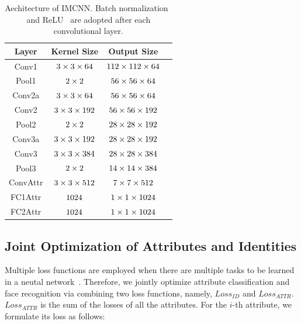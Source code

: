 \documentclass[wcp]{jmlr}
\begin{document}
	\begin{table}[htb]
		\begin{center}
			\begin{tabular}{|c|c|c|c}
				\hline
				Layer & Kernel Size & Output Size \\
				\hline
				Conv1 & $\tiny{3\times3\times64}$ & $\tiny{112\times112\times64}$ \\
				\hline
				Pool1 & $\tiny{2\times2}$ & $\tiny{56\times56\times64}$ \\
				\hline
				Conv2a & $\tiny{3\times3\times64}$ & $\tiny{56\times56\times64}$ \\
				\hline
				Conv2 & $\tiny{3\times3\times192}$ & $\tiny{56\times56\times192}$ \\
				\hline
				Pool2 & $\tiny{2\times2}$ & $\tiny{28\times28\times192}$ \\
				\hline
				Conv3a & $\tiny{3\times3\times192}$ & $\tiny{28\times28\times192}$ \\
				\hline
				Conv3 & $\tiny{3\times3\times384}$ & $\tiny{28\times28\times384}$ \\
				\hline
				Pool3 & $\tiny{2\times2}$ & $\tiny{14\times14\times384}$ \\
				\hline
				ConvAttr & $\tiny{3\times3\times512}$ & $\tiny{7\times7\times512}$ \\
				\hline
				FC1Attr & $\tiny{1024}$ & $\tiny{1\times1\times1024}$ \\
				\hline
				FC2Attr & $\tiny{1024}$ & $\tiny{1\times1\times1024}$ \\
				\hline
			\end{tabular}
		\end{center}
		\caption[short]{Aechitecture of IMCNN. Batch normalization~\cite{BatchNorm} and ReLU~\cite{ReLU} are adopted after each convolutional layer.}
		\label{IMCNN net}
	\end{table}
	
	\subsection{Joint Optimization of Attributes and Identities}
	Multiple loss functions are employed when there are multiple tasks to be learned in a neutal network~\cite{yolo9000,liu2016ssd,long2015fully}. Therefore, we jointly optimize attribute classification and face recognition via combining two loss functions, namely, $Loss_{ID}$ and $Loss_{ATTR}$. $Loss_{ATTR}$ is the sum of the losses of all the attributes. For the $i$-th attribute, we formulate its loss as follows:
	
\end{document}
